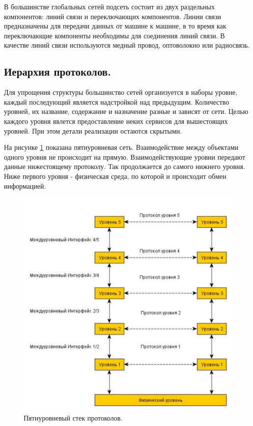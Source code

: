 \documentclass[12pt]{report}
\begin{document}
    В большинстве глобальных сетей подсеть состоит из двух раздельных компонентов: линий связи и переключающих компонентов. Линии связи предназначены для передачи данных от машине к машине, в то время как переключающие компоненты необходимы для соединения линий связи. В качестве линий связи используются медный провод, оптоволокно или радиосвязь.

    \subsection{Иерархия протоколов. }

    Для упрощения структуры большинство сетей организуется в наборы уровне, каждый последующий является надстройкой над предыдущим. Количество уровней, их название, содержание и назначение разные и зависят от сети. Целью каждого уровня явлется предоставление неких сервисов для вышестоящих уровней. При этом детали реализации остаются скрытыми.

    На рисунке \ref{Pic1} показана пятиуровневая сеть. Взаимодействие между объектами одного уровня не происходит на прямую. Взаимодействующие уровни передают данные нижестоящему протоколу. Так продолжается до самого нижнего уровня. Ниже первого уровня - физическая среда, по которой и происходит обмен информацией.

    \begin{figure}\center
        \includegraphics[width = 120mm]{Ch2Pic1}
        \caption{Пятиуровневый стек протоколов.} \label{Pic1}
    \end{figure}
\end{document}
